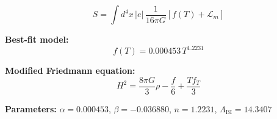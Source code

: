 
\begin{equation}
  S = \int d^4x \, |e| \, \frac{1}{16\pi G} \left[ f(T) + \mathcal{L}_m \right]
\end{equation}

\textbf{Best-fit model:}
\begin{equation}
  f(T) = 0.000453 \, T^{1.2231}
\end{equation}

\textbf{Modified Friedmann equation:}
\begin{equation}
  H^2 = \frac{8\pi G}{3} \rho - \frac{f}{6} + \frac{T f_T}{3}
\end{equation}

\textbf{Parameters:}
$\alpha = 0.000453$, \quad
$\beta = -0.036880$, \quad
$n = 1.2231$, \quad
$\Lambda_{\text{BI}} = 14.3407$